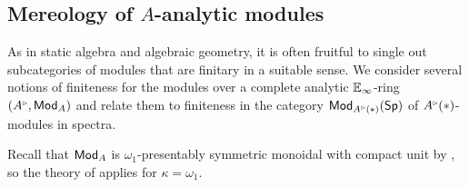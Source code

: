 \subsection{Mereology of \texorpdfstring{$A$}{A}-analytic modules}\label{subsec: mereology of analytic modules}
As in static algebra and algebraic geometry, it is often fruitful to single out subcategories of modules that are finitary in a suitable sense. We consider several notions of finiteness for the modules over a complete analytic $\mathbb{E}_{\infty}$-ring $(A^{\tri},\Mod_{A})$ and relate them to finiteness in the category $\Mod_{A^{\tri}(*)}(\Sp)$ of $A^{\tri}(*)$-modules in spectra. 

Recall that $\mathsf{Mod}_{A}$ is $\omega_{1}$-presentably symmetric monoidal with compact unit by , so the theory of  applies for $\kappa=\omega_{1}$.

